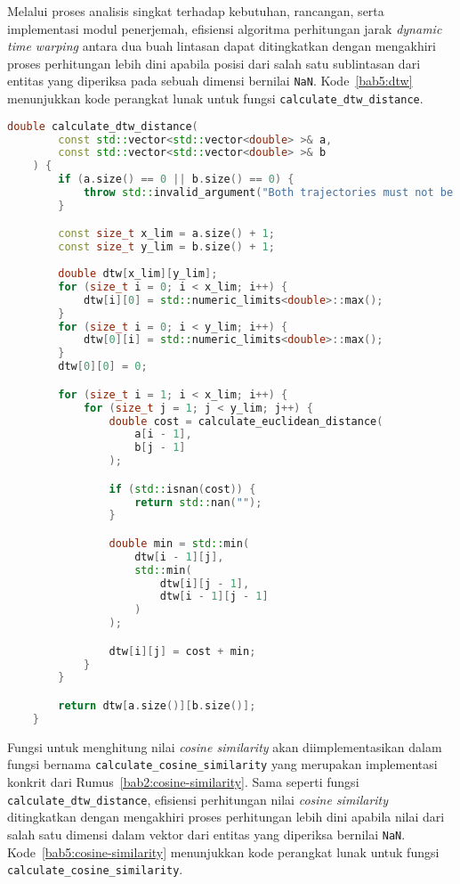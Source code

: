 Melalui proses analisis singkat terhadap kebutuhan, rancangan, serta implementasi modul penerjemah, efisiensi algoritma perhitungan jarak \textit{dynamic time warping} antara dua buah lintasan dapat ditingkatkan dengan mengakhiri proses perhitungan lebih dini apabila posisi dari salah satu sublintasan dari entitas yang diperiksa pada sebuah dimensi bernilai \texttt{NaN}. Kode~\ref{bab5:dtw} menunjukkan kode perangkat lunak untuk fungsi \texttt{calculate\_dtw\_distance}.

\begin{lstlisting}[language=C++, caption=Implementasi fungsi \texttt{calculate\_dtw\_distance}, label={bab5:dtw}]
    double calculate_dtw_distance(
        const std::vector<std::vector<double> >& a,
        const std::vector<std::vector<double> >& b
    ) {
        if (a.size() == 0 || b.size() == 0) {
            throw std::invalid_argument("Both trajectories must not be empty.");
        }

        const size_t x_lim = a.size() + 1;
        const size_t y_lim = b.size() + 1;
        
        double dtw[x_lim][y_lim];
        for (size_t i = 0; i < x_lim; i++) {
            dtw[i][0] = std::numeric_limits<double>::max();
        }
        for (size_t i = 0; i < y_lim; i++) {
            dtw[0][i] = std::numeric_limits<double>::max();
        }
        dtw[0][0] = 0;

        for (size_t i = 1; i < x_lim; i++) {
            for (size_t j = 1; j < y_lim; j++) {
                double cost = calculate_euclidean_distance(
                    a[i - 1],
                    b[j - 1]
                );

                if (std::isnan(cost)) {
                    return std::nan("");
                }

                double min = std::min(
                    dtw[i - 1][j],
                    std::min(
                        dtw[i][j - 1],
                        dtw[i - 1][j - 1]
                    )
                );

                dtw[i][j] = cost + min;
            }
        }

        return dtw[a.size()][b.size()];
    }
\end{lstlisting}

Fungsi untuk menghitung nilai \textit{cosine similarity} akan diimplementasikan dalam fungsi bernama \texttt{calculate\_cosine\_similarity} yang merupakan implementasi konkrit dari Rumus~\ref{bab2:cosine-similarity}. Sama seperti fungsi \texttt{calculate\_dtw\_distance}, efisiensi perhitungan nilai \textit{cosine similarity} ditingkatkan dengan mengakhiri proses perhitungan lebih dini apabila nilai dari salah satu dimensi dalam vektor dari entitas yang diperiksa bernilai \texttt{NaN}. Kode~\ref{bab5:cosine-similarity} menunjukkan kode perangkat lunak untuk fungsi \texttt{calculate\_cosine\_similarity}.

